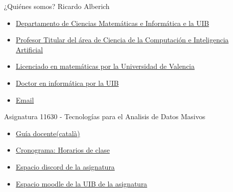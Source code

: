\documentclass[
  ignorenonframetext,
]{beamer}
\providecommand{\tightlist}{%
  \setlength{\itemsep}{0pt}\setlength{\parskip}{0pt}}
\begin{document}
\begin{frame}{¿Quiénes somos? Ricardo Alberich}
\protect\hypertarget{quiuxe9nes-somos-ricardo-alberich}{}
\begin{itemize}
\tightlist
\item
  \href{https://www.uib.es/es/lauib/Govern-i-organitzacio/estructura/Departaments/dmi/}{Departamento
  de Ciencias Matemáticas e Informática e la UIB}
\item
  \href{https://www.uib.es/es/personal/ABDI0ODk/}{Profesor Titular del
  área de Ciencia de la Computación e Inteligencia Artificial}
\item
  \href{https://www.uv.es/uvweb/universidad/es/universidad-valencia-1285845048380.html}{Licenciado
  en matemáticas por la Universidad de Valencia}
\item
  \href{https://www.uib.cat/}{Doctor en informática por la UIB}
\item
  \href{mailto:r.alberich@uib.es}{Email}
\end{itemize}
\end{frame}

\begin{frame}{Asignatura 11630 - Tecnologías para el Analisis de Datos
Masivos}
\protect\hypertarget{asignatura-11630---tecnologuxedas-para-el-analisis-de-datos-masivos}{}
\begin{itemize}
\tightlist
\item
  \href{https://academic.uib.es/doa/consultaPublica/look\%5bconpub\%5dMostrarPubGuiaDocAs?entradaPublica=true\&idiomaPais=ca.ES\&_anoAcademico=2020\&_codAsignatura=11630}{Guía
  docente(català)}
\item
  \href{https://academic.uib.es/pds/consultaPublica/look\%5Bconpub\%5DInicioPubHora?entradaPublica=true\&lock=true\&idiomaPais=es.ES\&planDocente=2020\&centro=9395\&estudio=260\&planEstudio=590\&curso=1\&trimestre=S/1\&asignatura11630=11630\&\&grupo0=1\&consultarAsignaturaGrupoPrivada=S}{Cronograma:
  Horarios de clase}
\item
  \href{https://discord.gg/uphEZMR}{Espacio discord de la asignatura}
\item
  \href{https://ad.uib.es/estudis2021/course/view.php?id=1524}{Espacio
  moodle de la UIB de la asignatura}
\end{itemize}
\end{frame}
\end{document}
